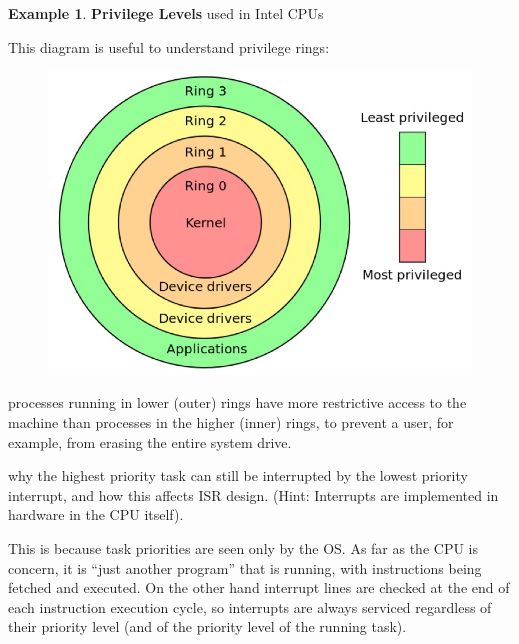 \documentclass[12pt,a4paper]{article}
\theoremstyle{definition}
\newtheorem{example}{Example}[section]
\begin{document}
\begin{example}{\textbf{Privilege Levels}  used in Intel CPUs}
	
	This diagram is useful to understand privilege rings:
	
	\begin{figure}[!h]
		\includegraphics[scale=0.2]{m1/privilegeRing}
		\centering
	\end{figure}
	
	processes running in lower (outer) rings have more restrictive access to the machine than processes in the higher (inner) rings, to prevent a user, for example, from erasing the entire system drive.
	
	\begin{tcolorbox}
		\textsf{why the highest priority task can still be interrupted by the lowest priority interrupt}, and how this affects ISR design. (Hint: Interrupts are implemented in hardware in the CPU itself).
		
		This is because task priorities are seen only by the OS. As far as the CPU is concern, it is “just another program” that is running, with instructions being fetched and executed. On the other hand interrupt lines are checked at the end of each instruction execution cycle, so interrupts are always serviced regardless of their priority level (and of the priority level of the running task).
	\end{tcolorbox}
\end{example}
\end{document}
